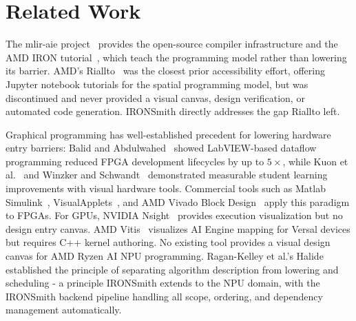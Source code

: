 \section{Related Work} \label{sec:related_work}
\vspace{-3mm}

The mlir-aie project~\cite{mliraie} provides the open-source compiler infrastructure and the AMD IRON tutorial~\cite{iron2025}, which teach the programming model rather than lowering its barrier. AMD's Riallto~\cite{riallto} was the closest prior accessibility effort, offering Jupyter notebook tutorials for the spatial programming model, but was discontinued and never provided a visual canvas, design verification, or automated code generation. IRONSmith directly addresses the gap Riallto left.


Graphical programming has well-established precedent for lowering hardware entry barriers: Balid and Abdulwahed~\cite{balid2013} showed LabVIEW-based dataflow programming reduced FPGA development lifecycles by up to $5\times$, while Kuon et al.~\cite{kuon2014} and Winzker and Schwandt~\cite{winzker2019} demonstrated measurable student learning improvements with visual hardware tools. Commercial tools such as Matlab Simulink~\cite{simulink}, VisualApplets~\cite{visualapplets}, and AMD Vivado Block Design~\cite{vivado} apply this paradigm to FPGAs. For GPUs, NVIDIA Nsight~\cite{nsight} provides execution visualization but no design entry canvas. AMD Vitis~\cite{vitis} visualizes AI Engine mapping for Versal devices but requires C++ kernel authoring. No existing tool provides a visual design canvas for AMD Ryzen AI NPU programming. Ragan-Kelley et al.'s Halide~\cite{halide2013} established the principle of separating algorithm description from lowering and scheduling - a principle IRONSmith extends to the NPU domain, with the IRONSmith backend pipeline handling all scope, ordering, and dependency management automatically.

\vspace{-3mm}
